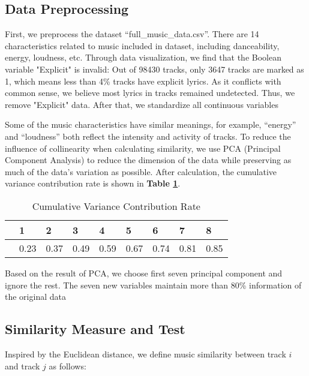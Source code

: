 \documentclass[12pt]{article}  %
\begin{document}
	\subsection{Data Preprocessing}
	First, we preprocess the dataset “full\_music\_data.csv”. There are 14 characteristics related
	to music included in dataset, including danceability, energy, loudness, etc. Through data visualization, we find that the Boolean variable "Explicit" is invalid: Out of 98430 tracks, only 3647 tracks are marked as 1, which means less than 4\% tracks have explicit lyrics. As it conflicts with common sense, we believe most lyrics in tracks remained undetected. Thus, we remove "Explicit" data. After that, we standardize all continuous variables
	
	Some of the music characteristics have similar meanings, for example, “energy” and “loudness” both reflect the intensity and activity of tracks. To reduce the influence of collinearity
	when calculating similarity, we use PCA (Principal Component Analysis) to reduce the dimension of the data while preserving as much of the data’s variation as possible. After calculation,
	the cumulative variance contribution rate is shown in \textbf{Table \ref{tb:CVCE}}.
	
	\begin{table}[!htbp]\footnotesize
		\begin{center}
			\caption{Cumulative Variance Contribution Rate}
			\begin{tabular}{lllllllll}
				\toprule
				\text { Number of Principal Component } & 1 & 2 & 3 & 4 & 5 & 6 & 7 & 8 \\
				\midrule
				\text { Cumulative Variance Contribution Rate } & 0.23 & 0.37 & 0.49 & 0.59 & 0.67 & 0.74 & 0.81 & 0.85 \\
				\bottomrule
			\end{tabular}\label{tb:CVCE}
		\end{center}
	\end{table}
	
	Based on the result of PCA, we choose first seven principal component and ignore the rest. The seven new variables maintain more than 80\% information of the original data
	
	\subsection{Similarity Measure and Test}
	
	Inspired by the Euclidean distance, we define music similarity between track $ i $ and track $ j $ as follows:
	
\end{document}
